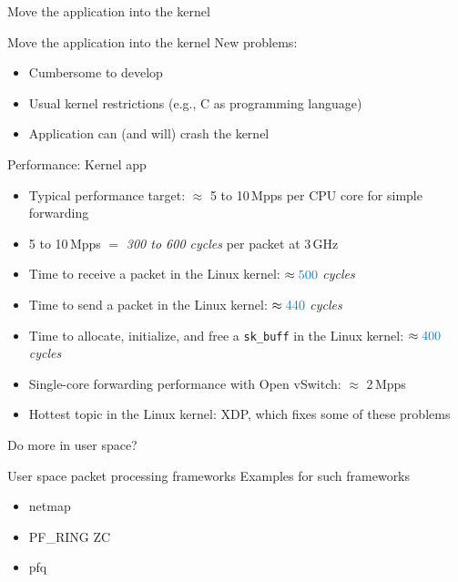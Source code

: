 \documentclass[NET,english,aspectratio=169]{tumbeamer}
\begin{document}

\begin{frame}{Move the application into the kernel}
\centering
\end{frame}

\begin{frame}{Move the application into the kernel}
New problems:
\begin{itemize}
\item Cumbersome to develop
\item Usual kernel restrictions (e.g., C as programming language)
\item Application can (and will) crash the kernel
\end{itemize}
\end{frame}

\begin{frame}{Performance: Kernel app}
\begin{itemize}
\item<1-> Typical performance target: $\approx$ 5 to 10\,Mpps per CPU core for simple forwarding
\item<1-> 5 to 10\,Mpps $=$ \emph{300 to 600 cycles} per packet at 3\,GHz
\vspace{1em}
\item<2-> Time to receive a packet in the Linux kernel: $\approx \emph{500}$ \emph{cycles}
\item<3-> Time to send a packet in the Linux kernel: $\approx \emph{440}$ \emph{cycles}
\item<4-> Time to allocate, initialize, and free a \texttt{sk\_buff} in the Linux kernel: $\approx \emph{400}$ \emph{cycles}
\vspace{1em}
\item<5-> Single-core forwarding performance with Open vSwitch: $\approx$ 2\,Mpps
\item<5-> Hottest topic in the Linux kernel: XDP, which fixes some of these problems
\end{itemize}
\end{frame}


\begin{frame}{Do more in user space?}
\centering
\end{frame}

\begin{frame}{User space packet processing frameworks}
Examples for such frameworks
\begin{itemize}
\item netmap
\item PF\_RING ZC
\item pfq
\end{itemize}
\end{frame}
\end{document}
